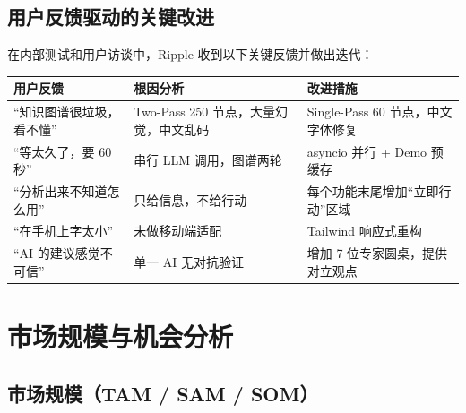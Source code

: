 \documentclass[12pt,a4paper]{ctexart}
\begin{document}
\subsection{用户反馈驱动的关键改进}

在内部测试和用户访谈中，Ripple 收到以下关键反馈并做出迭代：

\begin{center}
{\small
\begin{tabular}{p{4cm} p{5cm} p{5cm}}
\toprule
\textbf{用户反馈} & \textbf{根因分析} & \textbf{改进措施} \\
\midrule
``知识图谱很垃圾，看不懂'' & Two-Pass 250 节点，大量幻觉，中文乱码 & Single-Pass 60 节点，中文字体修复 \\[3pt]
``等太久了，要 60 秒'' & 串行 LLM 调用，图谱两轮 & asyncio 并行 + Demo 预缓存 \\[3pt]
``分析出来不知道怎么用'' & 只给信息，不给行动 & 每个功能末尾增加``立即行动''区域 \\[3pt]
``在手机上字太小'' & 未做移动端适配 & Tailwind 响应式重构 \\[3pt]
``AI 的建议感觉不可信'' & 单一 AI 无对抗验证 & 增加 7 位专家圆桌，提供对立观点 \\
\bottomrule
\end{tabular}
}
\end{center}


\newpage
\begin{center}
\end{center}

\section{市场规模与机会分析}

\subsection{市场规模（TAM / SAM / SOM）}
\end{document}
